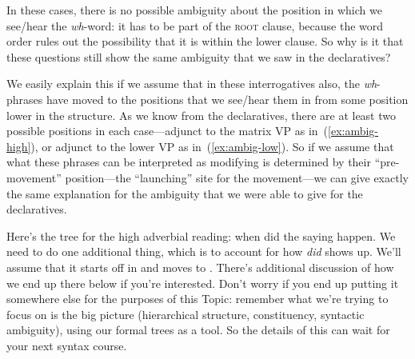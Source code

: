 \documentclass{article}
\begin{document}
In these cases, there is no possible ambiguity about the position in which we see/hear the \emph{wh}-word: it has to be part of the \textsc{root} clause, because the word order rules out the possibility that it is within the lower clause.
So why is it that these questions still show the same ambiguity that we saw in the declaratives?

We easily explain this if we assume that in these interrogatives also, the \emph{wh}-phrases have moved to the positions that we see/hear them in from some position lower in the structure.
As we know from the declaratives, there are at least two possible positions in each case---adjunct to the matrix VP as in~(\ref{ex:ambig-high}), or adjunct to the lower VP as in~(\ref{ex:ambig-low}). So if we assume that what these phrases can be interpreted as modifying is determined by their ``pre-movement'' position---the ``launching'' site for the movement---we can give exactly the same explanation for the ambiguity that we were able to give for the declaratives.

Here's the tree for the high adverbial reading: when did the saying happen. We need to do one additional thing, which is to account for how \emph{did} shows up. We'll assume that it starts off in  and moves to . There's additional discussion of how we end up there below if you're interested. Don't worry if you end up putting it somewhere else for the purposes of this Topic: remember what we're trying to focus on is the big picture (hierarchical structure, constituency, syntactic ambiguity), using our formal trees as a tool. So the details of this  can wait for your next syntax course.

\z
\end{document}
